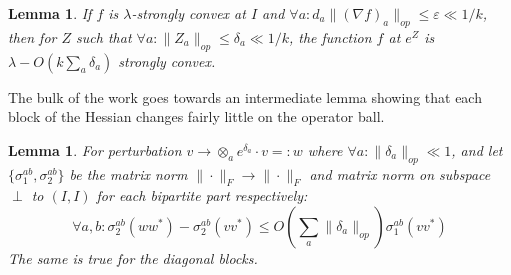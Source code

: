 \documentclass{article}
\newtheorem{lemma}[theorem]{Lemma}
\newcommand\eps{\varepsilon}
\begin{document}
\begin{lemma}\label{lem:perturbation}
If $f$ is $\lambda$-strongly convex at $I$ and $\forall a: d_{a} \|(\nabla f)_{a}\|_{op} \leq \eps \ll 1/k$, then for $Z$ such that $\forall a: \|Z_{a}\|_{op} \leq \delta_{a} \ll 1/k$, the function $f$ at $e^{Z}$ is $\lambda - O(k \sum_{a} \delta_{a})$ strongly convex.
\end{lemma}




The bulk of the work goes towards an intermediate lemma showing that each block of the Hessian changes fairly little on the operator ball.


\begin{lemma}\label{lem:block-perturbation}
For perturbation $v \to \otimes_{a} e^{\delta_{a}} \cdot v =: w$ where $\forall a: \|\delta_{a}\|_{op} \ll 1$, and let $\{\sigma_{1}^{ab}, \sigma_{2}^{ab}\}$ be the matrix norm $\|\cdot\|_{F} \to \|\cdot\|_{F}$ and matrix norm on subspace $\perp$ to $(I,I)$ for each bipartite part respectively:
\[ \forall a,b: \sigma_{2}^{ab}(w w^{*}) - \sigma_{2}^{ab}(v v^{*}) \leq O \left( \sum_{a} \|\delta_{a}\|_{op}  \right) \sigma_{1}^{ab}(v v^{*})   \]
The same is true for the diagonal blocks.
\end{lemma}
\end{document}
